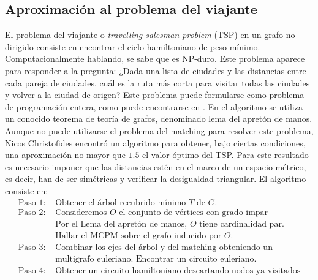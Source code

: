 \documentclass[twoside,a4paper,openright,12pt,tikz]{book}
\begin{document}
\subsection{Aproximación al problema del viajante}
El problema del viajante o \textit{travelling salesman problem} (TSP) en un grafo no dirigido consiste en encontrar el ciclo hamiltoniano de peso mínimo. Computacionalmente hablando, se sabe que es NP-duro. Este problema aparece para responder a la pregunta: ¿Dada una lista de ciudades y las distancias entre cada pareja de ciudades, cuál es la ruta más corta para visitar todas las ciudades y volver a la ciudad de origen? Este problema puede formularse como problema de programación entera, como puede encontrarse en \cite{papa}. 
En el algoritmo se utiliza un conocido teorema de teoría de grafos, denominado lema del apretón de manos.
Aunque no puede utilizarse el problema del matching para resolver este problema, Nicos Christofides encontró un algoritmo \cite{nico} para obtener, bajo ciertas condiciones, una aproximación no mayor que $1.5$ el valor óptimo del TSP. Para este resultado es necesario imponer que las distancias estén en el marco de un espacio métrico, es decir, han de ser simétricas y verificar la desigualdad triangular. El algoritmo consiste en:
\begin{align*}
\text{Paso 1: }&\text{Obtener el árbol recubrido mínimo $T$ de $G$.}\\
\text{Paso 2: }&\text{Consideremos $O$ el conjunto de vértices con grado impar}\\
&\text{Por el Lema del apretón de manos, $O$ tiene cardinalidad par.}\\
&\text{Hallar el MCPM sobre el grafo inducido por $O$.}\\
\text{Paso 3: }& \text{Combinar los ejes del árbol y del matching obteniendo un}\\
&\text{multigrafo euleriano. Encontrar un circuito euleriano.}\\
\text{Paso 4: }&\text{Obtener un circuito hamiltoniano descartando nodos ya visitados}
\end{align*} 
\end{document}
